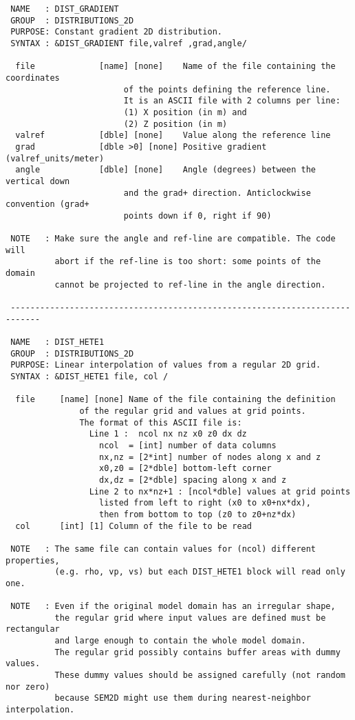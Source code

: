 \begin{verbatim}
 NAME   : DIST_GRADIENT
 GROUP  : DISTRIBUTIONS_2D
 PURPOSE: Constant gradient 2D distribution.
 SYNTAX : &DIST_GRADIENT file,valref ,grad,angle/

  file             [name] [none]    Name of the file containing the coordinates
                        of the points defining the reference line.
                        It is an ASCII file with 2 columns per line:
                        (1) X position (in m) and
                        (2) Z position (in m)
  valref           [dble] [none]    Value along the reference line
  grad             [dble >0] [none] Positive gradient (valref_units/meter)
  angle            [dble] [none]    Angle (degrees) between the vertical down 
                        and the grad+ direction. Anticlockwise convention (grad+
                        points down if 0, right if 90)

 NOTE   : Make sure the angle and ref-line are compatible. The code will
          abort if the ref-line is too short: some points of the domain
          cannot be projected to ref-line in the angle direction.

 ----------------------------------------------------------------------------

 NAME   : DIST_HETE1
 GROUP  : DISTRIBUTIONS_2D
 PURPOSE: Linear interpolation of values from a regular 2D grid.
 SYNTAX : &DIST_HETE1 file, col /

  file     [name] [none] Name of the file containing the definition
               of the regular grid and values at grid points.
               The format of this ASCII file is:
                 Line 1 :  ncol nx nz x0 z0 dx dz
                   ncol  = [int] number of data columns 
                   nx,nz = [2*int] number of nodes along x and z
                   x0,z0 = [2*dble] bottom-left corner 
                   dx,dz = [2*dble] spacing along x and z
                 Line 2 to nx*nz+1 : [ncol*dble] values at grid points
                   listed from left to right (x0 to x0+nx*dx), 
                   then from bottom to top (z0 to z0+nz*dx)
  col      [int] [1] Column of the file to be read

 NOTE   : The same file can contain values for (ncol) different properties,
          (e.g. rho, vp, vs) but each DIST_HETE1 block will read only one.

 NOTE   : Even if the original model domain has an irregular shape, 
          the regular grid where input values are defined must be rectangular
          and large enough to contain the whole model domain. 
          The regular grid possibly contains buffer areas with dummy values. 
          These dummy values should be assigned carefully (not random nor zero)
          because SEM2D might use them during nearest-neighbor interpolation.


\end{verbatim}
